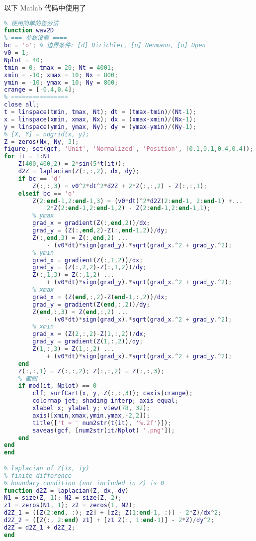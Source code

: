 以下 Matlab 代码中使用了 
\begin{lstlisting}[language=matlab, caption=wav2D.m]
% 二维波动方程的简单数值解
% 使用简单的差分法
function wav2D
% === 参数设置 ====
bc = 'o'; % 边界条件: [d] Dirichlet, [n] Neumann, [o] Open
v0 = 1;
Nplot = 40;
tmin = 0; tmax = 20; Nt = 4001;
xmin = -10; xmax = 10; Nx = 800;
ymin = -10; ymax = 10; Ny = 800;
crange = [-0.4,0.4];
% ================
close all;
t = linspace(tmin, tmax, Nt); dt = (tmax-tmin)/(Nt-1);
x = linspace(xmin, xmax, Nx); dx = (xmax-xmin)/(Nx-1);
y = linspace(ymin, ymax, Ny); dy = (ymax-ymin)/(Ny-1);
% [X, Y] = ndgrid(x, y);
Z = zeros(Nx, Ny, 3);
figure; set(gcf, 'Unit', 'Normalized', 'Position', [0.1,0.1,0.4,0.4]);
for it = 1:Nt
    Z(400,400,2) = 2*sin(5*t(it));
    d2Z = laplacian(Z(:,:,2), dx, dy);
    if bc == 'd'
        Z(:,:,3) = v0^2*dt^2*d2Z + 2*Z(:,:,2) - Z(:,:,1);
    elseif bc == 'o'
        Z(2:end-1,2:end-1,3) = (v0*dt)^2*d2Z(2:end-1, 2:end-1) +...
            2*Z(2:end-1,2:end-1,2) - Z(2:end-1,2:end-1,1);
        % ymax
        grad_x = gradient(Z(:,end,2))/dx;
        grad_y = (Z(:,end,2)-Z(:,end-1,2))/dy;
        Z(:,end,3) = Z(:,end,2) ...
            - (v0*dt)*sign(grad_y).*sqrt(grad_x.^2 + grad_y.^2);
        % ymin
        grad_x = gradient(Z(:,1,2))/dx;
        grad_y = (Z(:,2,2)-Z(:,1,2))/dy;
        Z(:,1,3) = Z(:,1,2) ...
            + (v0*dt)*sign(grad_y).*sqrt(grad_x.^2 + grad_y.^2);
        % xmax
        grad_x = (Z(end,:,2)-Z(end-1,:,2))/dx;
        grad_y = gradient(Z(end,:,2))/dy;
        Z(end,:,3) = Z(end,:,2) ...
            - (v0*dt)*sign(grad_x).*sqrt(grad_x.^2 + grad_y.^2);
        % xmin
        grad_x = (Z(2,:,2)-Z(1,:,2))/dx;
        grad_y = gradient(Z(1,:,2))/dy;
        Z(1,:,3) = Z(1,:,2) ...
            + (v0*dt)*sign(grad_x).*sqrt(grad_x.^2 + grad_y.^2);
    end
    Z(:,:,1) = Z(:,:,2); Z(:,:,2) = Z(:,:,3);
    % 画图
    if mod(it, Nplot) == 0
        clf; surfCart(x, y, Z(:,:,3)); caxis(crange);
        colormap jet; shading interp; axis equal;
        xlabel x; ylabel y; view(78, 32);
        axis([xmin,xmax,ymin,ymax,-2,2]);
        title(['t = ' num2str(t(it), '%.2f')]);
        saveas(gcf, [num2str(it/Nplot) '.png']);
    end
end
end

% laplacian of Z(ix, iy)
% finite difference
% boundary condition (not included in Z) is 0
function d2Z = laplacian(Z, dx, dy)
N1 = size(Z, 1); N2 = size(Z, 2);
z1 = zeros(N1, 1); z2 = zeros(1, N2);
d2Z_1 = ([Z(2:end, :); z2] + [z2; Z(1:end-1, :)] - 2*Z)/dx^2;
d2Z_2 = ([Z(:, 2:end) z1] + [z1 Z(:, 1:end-1)] - 2*Z)/dy^2;
d2Z = d2Z_1 + d2Z_2;
end
\end{lstlisting}

